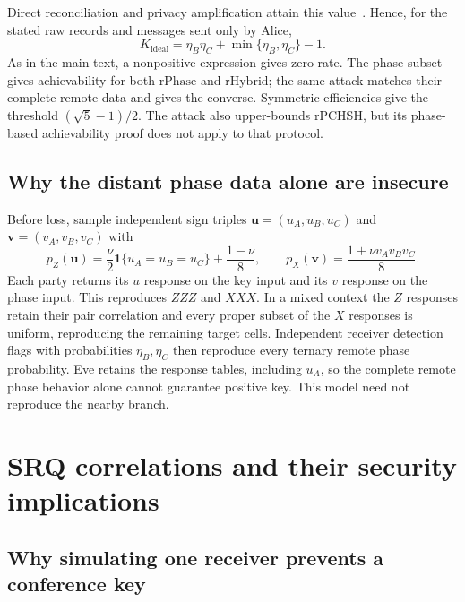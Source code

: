 \documentclass[aps,10pt,onecolumn,prx,superscriptaddress,longbibliography,nofootinbib]{revtex4-2}
\newcommand{\rPCHSH}{\mathrm{rPCHSH}}
\newcommand{\rPhase}{\mathrm{rPhase}}
\newcommand{\rHybrid}{\mathrm{rHybrid}}
\begin{document}
Direct reconciliation and privacy amplification attain this value~\cite{DevetakWinter2005}. Hence, for the stated raw records and messages sent only by Alice,
\begin{equation}
 K_{\mathrm{ideal}}=\eta_B\eta_C+\min\{\eta_B,\eta_C\}-1.
 \label{eq:si-ideal-rate}
\end{equation}
As in the main text, a nonpositive expression gives zero rate. The phase subset gives achievability for both \(\rPhase\) and \(\rHybrid\); the same attack matches their complete remote data and gives the converse. Symmetric efficiencies give the threshold \((\sqrt5-1)/2\). The attack also upper-bounds \(\rPCHSH\), but its phase-based achievability proof does not apply to that protocol.

\subsection{Why the distant phase data alone are insecure}\label{app:phase-local}

Before loss, sample independent sign triples \(\mathbf u=(u_A,u_B,u_C)\) and \(\mathbf v=(v_A,v_B,v_C)\) with
\begin{equation}
 p_Z(\mathbf u)=\frac\nu2\mathbf1\{u_A=u_B=u_C\}+\frac{1-\nu}{8},
 \qquad p_X(\mathbf v)=\frac{1+\nu v_Av_Bv_C}{8}.
 \label{eq:si-phase-local-model}
\end{equation}
Each party returns its \(u\) response on the key input and its \(v\) response on the phase input. This reproduces \(ZZZ\) and \(XXX\). In a mixed context the \(Z\) responses retain their pair correlation and every proper subset of the \(X\) responses is uniform, reproducing the remaining target cells. Independent receiver detection flags with probabilities \(\eta_B,\eta_C\) then reproduce every ternary remote phase probability. Eve retains the response tables, including \(u_A\), so the complete remote phase behavior alone cannot guarantee positive key. This model need not reproduce the nearby branch.

\section{SRQ correlations and their security implications}\label{app:srq}

\subsection{Why simulating one receiver prevents a conference key}
\end{document}
